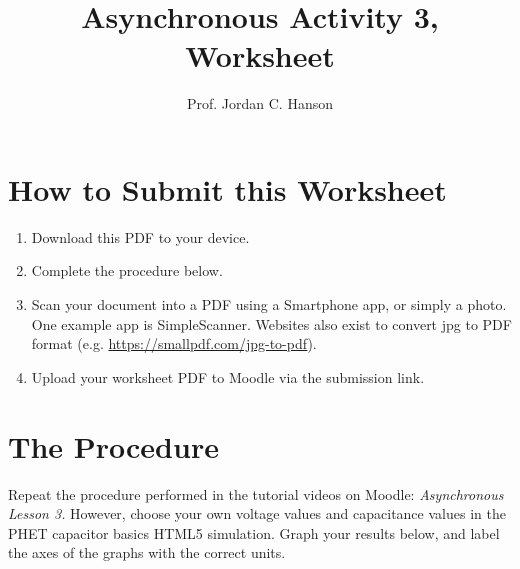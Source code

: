 \documentclass{article}
\begin{document}
\title{Asynchronous Activity 3, Worksheet}
\author{Prof. Jordan C. Hanson}

\maketitle

\section{How to Submit this Worksheet}

\begin{enumerate}
\item Download this PDF to your device.
\item Complete the procedure below.
\item Scan your document into a PDF using a Smartphone app, or simply a photo.  One example app is SimpleScanner.  Websites also exist to convert jpg to PDF format (e.g. \url{https://smallpdf.com/jpg-to-pdf}).
\item Upload your worksheet PDF to Moodle via the submission link.
\end{enumerate}

\section{The Procedure}

Repeat the procedure performed in the tutorial videos on Moodle: \textit{Asynchronous Lesson 3.}  However, choose your own voltage values and capacitance values in the PHET capacitor basics HTML5 simulation.  Graph your results below, and label the axes of the graphs with the correct units. \\ \vspace{5cm}
\end{document}

